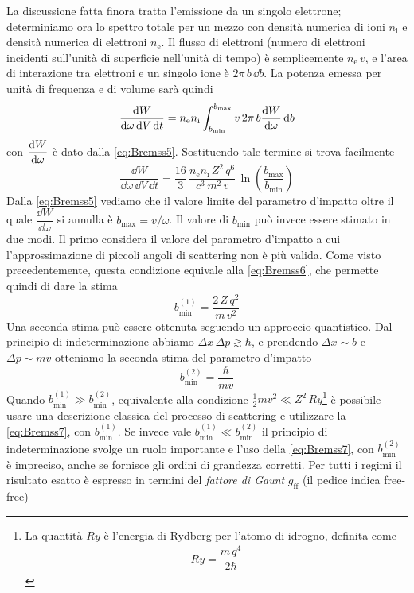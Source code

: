 La discussione fatta finora tratta l'emissione da un singolo elettrone; determiniamo ora lo spettro totale per un mezzo con densità numerica di ioni $n_\mathrm{i}$ e densità numerica di elettroni $n_\mathrm{e}$. Il flusso di elettroni (numero di elettroni incidenti sull'unità di superficie nell'unità di tempo) è semplicemente $n_\mathrm{e}\,v$, e l'area di interazione tra elettroni e un singolo ione è $2\pi \, b\, \dd b$. La potenza emessa per unità di frequenza e di volume sarà quindi
\begin{equation}
\dfrac{\mathrm{d} W}{\mathrm{d} \omega\,\mathrm{d} V \, \mathrm{d} t} = n_\mathrm{e} n_\mathrm{i} \int_{b_\mathrm{min}}^{b_\mathrm{max}} v\, 2\pi \, b \dfrac{\mathrm{d} {W}}{\mathrm{d} {\omega}} \, \mathrm{d} b
\end{equation}
con $\dfrac{\mathrm{d} {W}}{\mathrm{d} {\omega}}$ è dato dalla \ref{eq:Bremss5}. Sostituendo tale termine si trova facilmente
\begin{equation}
\dfrac{\dd W}{\dd \omega\,\dd V \, \dd t} = \dfrac{16}{3} \, \dfrac{n_\mathrm{e} n_\mathrm{i} \, Z^2\, q^6}{c^3\,m^2\,v} \, \ln\left(\dfrac{b_\mathrm{max}}{b_\mathrm{min}}\right) \label{eq:Bremss7}
\end{equation}
Dalla \ref{eq:Bremss5} vediamo che il valore limite del parametro d'impatto oltre il quale $\dfrac{\dd W}{\dd \omega}$ si annulla è $b_\mathrm{max} = v/\omega$. Il valore di $b_\mathrm{min}$ può invece essere stimato in due modi. Il primo considera il valore del parametro d'impatto a cui l'approssimazione di piccoli angoli di scattering non è più valida. Come visto precedentemente, questa condizione equivale alla \ref{eq:Bremss6}, che permette quindi di dare la stima
\begin{equation}
b_\mathrm{min}^{(1)} = \dfrac{2\,Z\,q^2}{m\,v^2}
\end{equation}
Una seconda stima può essere ottenuta seguendo un approccio quantistico. Dal principio di indeterminazione abbiamo $\Delta x\, \Delta p \gtrsim \hbar$, e prendendo $\Delta x \sim b$ e $\Delta p \sim mv$ otteniamo la seconda stima del parametro d'impatto
\begin{equation}
b_\mathrm{min}^{(2)} = \dfrac{\hbar}{mv}
\end{equation}
Quando $b_\mathrm{min}^{(1)} \gg b_\mathrm{min}^{(2)}$, equivalente alla condizione $\frac{1}{2} mv^2 \ll Z^2 \, Ry$\footnote{La quantità $Ry$ è l'energia di Rydberg per l'atomo di idrogno, definita come
\begin{align*}
Ry= \dfrac{m\, q^4}{2\hbar}
\end{align*}}
è possibile usare una descrizione classica del processo di scattering e utilizzare la \ref{eq:Bremss7}, con $b_\mathrm{min}^{(1)}$. Se invece vale $b_\mathrm{min}^{(1)} \ll b_\mathrm{min}^{(2)}$ il principio di indeterminazione svolge un ruolo importante e l'uso della \ref{eq:Bremss7}, con $b_\mathrm{min}^{(2)}$ è impreciso, anche se fornisce gli ordini di grandezza corretti. Per tutti i regimi il risultato esatto è espresso in termini del \textit{fattore di Gaunt} $g_\mathrm{ff}$ (il pedice indica free-free)
